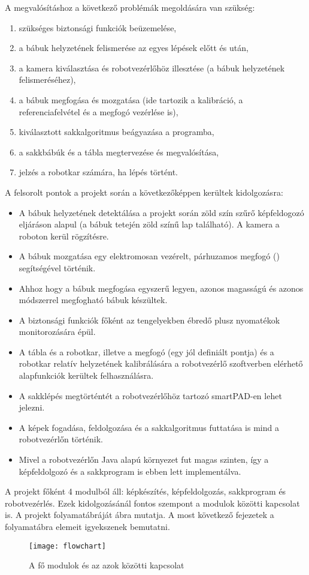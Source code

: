 \documentclass[../documentation.tex]{subfiles}
\begin{document}
A megvalósításhoz a következő problémák megoldására van szükség:
\begin{enumerate}
	\item szükséges biztonsági funkciók beüzemelése,
	\item a bábuk helyzetének felismerése az egyes lépések előtt és után,
	\item a kamera kiválasztása és robotvezérlőhöz illesztése (a bábuk helyzetének felismeréséhez),
	\item a bábuk megfogása és mozgatása (ide tartozik a kalibráció, a referenciafelvétel és a megfogó vezérlése is),
	\item kiválasztott sakkalgoritmus beágyazása a programba,
	\item a sakkbábúk és a tábla megtervezése és megvalósítása,
	\item jelzés a robotkar számára, ha lépés történt.
\end{enumerate}
A felsorolt pontok a projekt során a következőképpen kerültek kidolgozásra:
\begin{itemize}
	\item A bábuk helyzetének detektálása a projekt során zöld szín szűrő képfeldogozó eljáráson alapul (a bábuk tetején zöld színű lap található). A kamera a roboton kerül rögzítésre.
	\item A bábuk mozgatása egy elektromosan vezérelt, párhuzamos megfogó () segítségével történik.
	\item Ahhoz hogy a bábuk megfogása egyszerű legyen, azonos magasságú és azonos módszerrel megfogható bábuk készültek.
	\item A biztonsági funkciók főként az tengelyekben ébredő plusz nyomatékok monitorozására épül.
	\item A tábla és a robotkar, illetve a megfogó (egy jól definiált pontja) és a robotkar relatív helyzetének kalibrálására a robotvezérlő szoftverben elérhető alapfunkciók kerültek felhasználásra.
	\item A sakklépés megtörténtét a robotvezérlőhöz tartozó smartPAD-en lehet jelezni.
	\item A képek fogadása, feldolgozása és a sakkalgoritmus futtatása is mind a robotvezérlőn történik.
	\item Mivel a robotvezérlőn Java alapú környezet fut magas szinten, így a képfeldolgozó és a sakkprogram is ebben lett implementálva.
\end{itemize}

A projekt főként 4 modulból áll: képkészítés, képfeldolgozás, sakkprogram és robotvezérlés. Ezek kidolgozásánál fontos szempont a modulok közötti kapcsolat is. A projekt folyamatábráját  ábra mutatja. A most következő fejezetek a folyamatábra elemeit igyekszenek bemutatni.

\begin{figure}[h]
\centering
\texttt{[image: flowchart]}
\caption{A fő modulok és az azok közötti kapcsolat}
\label{fig:flowchart}
\end{figure}
\end{document}

